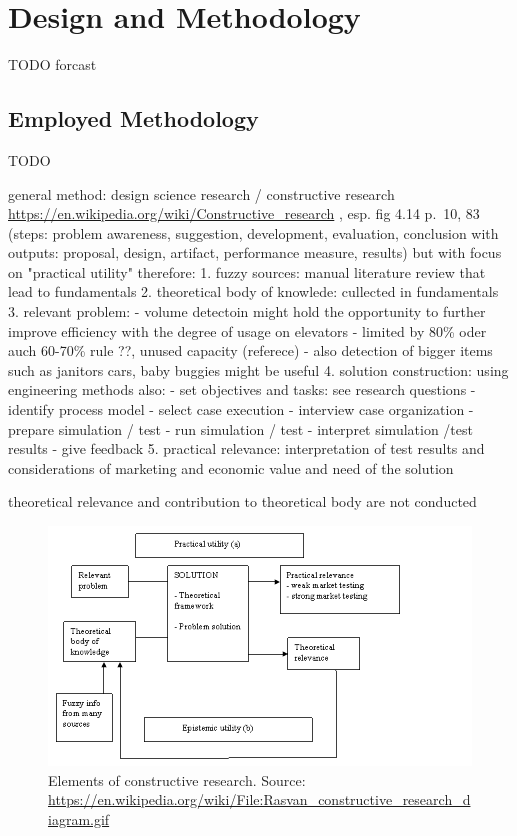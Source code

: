 \chapter{Design and Methodology}
\label{chap:design}
TODO forcast



\section{Employed Methodology}
TODO


general method:
design science research / constructive research
\url{https://en.wikipedia.org/wiki/Constructive_research}
\autocite[][pp.67--100]{dresh2015designresearch}, esp. fig 4.14 p.~10, 83 (steps: problem awareness, suggestion, development, evaluation, conclusion with outputs: proposal, design, artifact, performance measure, results)
but with focus on "practical utility"
therefore:
1. fuzzy sources: manual literature review that lead to fundamentals
2. theoretical body of knowlede: cullected in fundamentals
3. relevant problem: 
    - volume detectoin might hold the opportunity to further improve efficiency with the degree of usage on elevators
    - limited by 80\% oder auch 60-70\% rule \autocite[][p.~194]{unger2015aufzuege} ??, unused capacity (referece)
    - also detection of bigger items such as janitors cars, baby buggies  might be useful
4. solution construction: using engineering methods
    also:    
    - set objectives and tasks: see research questions
    - identify process model
    - select case execution
    - interview case organization
    - prepare simulation / test
    - run simulation / test
    - interpret simulation /test results
    - give feedback
5. practical relevance: interpretation of test results and considerations of marketing and economic value and need of the solution

theoretical relevance and contribution to theoretical body are not conducted

\begin{figure}[hbt]
	\centering
	\includegraphics[width=1.0\textwidth, keepaspectratio]{resources/Rasvan_constructive_research_diagram}
	\caption{\label{fig:design:constructiveresearch} Elements of constructive research. Source:
	\url{https://en.wikipedia.org/wiki/File:Rasvan_constructive_research_diagram.gif}}
\end{figure}


